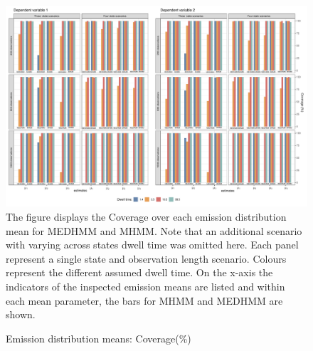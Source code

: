 \begin{figure}[h]
\caption{Emission distribution means: Coverage(\%)}
    \centering
    \includegraphics[width=\textwidth]{graphics/emiss_mu_cov.pdf}
     \flushleft
    \footnotesize
    \justifying
 The figure displays the Coverage over each emission distribution mean for MEDHMM and MHMM. Note that an additional scenario with varying across states dwell time was omitted here. Each panel represent a single state and observation length scenario. Colours represent the different assumed dwell time. On the x-axis the indicators of the inspected emission means are listed and within each mean parameter, the bars for MHMM and MEDHMM are shown. 
   
    \label{emiss_mu_cov}
\end{figure}



